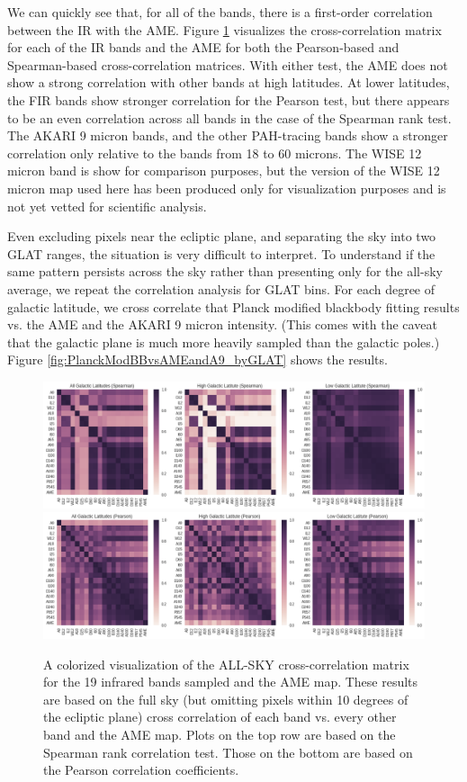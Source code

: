 \documentclass[preprint2,longabstract]{aastex}
\begin{document}
    We can quickly see that, for all of the bands, there is a first-order correlation between the IR with the AME. Figure \ref{fig:AME_IR_crosscorr_allbandsg} visualizes the cross-correlation matrix for each of the IR bands and the AME for both the Pearson-based and Spearman-based cross-correlation matrices. With either test, the AME does not show a strong correlation with other bands at high latitudes. At lower latitudes, the FIR bands show stronger correlation for the Pearson test, but there appears to be an even correlation across all bands in the case of the Spearman rank test. The AKARI 9 micron bands, and the other PAH-tracing bands show a stronger correlation only relative to the bands from 18 to 60 microns. The WISE 12 micron band is show for comparison purposes, but the version of the WISE 12 micron map used here has been produced only for visualization purposes and is not yet vetted for scientific analysis.

    Even excluding pixels near the ecliptic plane, and separating the sky into two GLAT ranges, the situation is very difficult to interpret. To understand if the same pattern persists across the sky rather than presenting only for the all-sky average, we repeat the correlation analysis for GLAT bins. For each degree of galactic latitude, we cross correlate that Planck modified blackbody fitting results vs. the AME and the AKARI 9 micron intensity. (This comes with the caveat that the galactic plane is much more heavily sampled than the galactic poles.) Figure \ref{fig:PlanckModBBvsAMEandA9_byGLAT} shows the results.


\begin{figure}
\label{fig:AME_IR_crosscorr_allbandsg}
\includegraphics[width=185mm]{../Plots/all_bands_corr_matrix_wAME_spearman.png}
\includegraphics[width=185mm]{../Plots/all_bands_corr_matrix_wAME_pearson.png}
\centering
\caption{A colorized visualization of the ALL-SKY cross-correlation matrix for the 19 infrared bands sampled and the AME map. These results are based on the full sky (but omitting pixels within 10 degrees of the ecliptic plane) cross correlation of each band vs. every other band and the AME map. Plots on the top row are based on the Spearman rank correlation test. Those on the bottom are based on the Pearson correlation coefficients. }
\end{figure}
\end{document}
